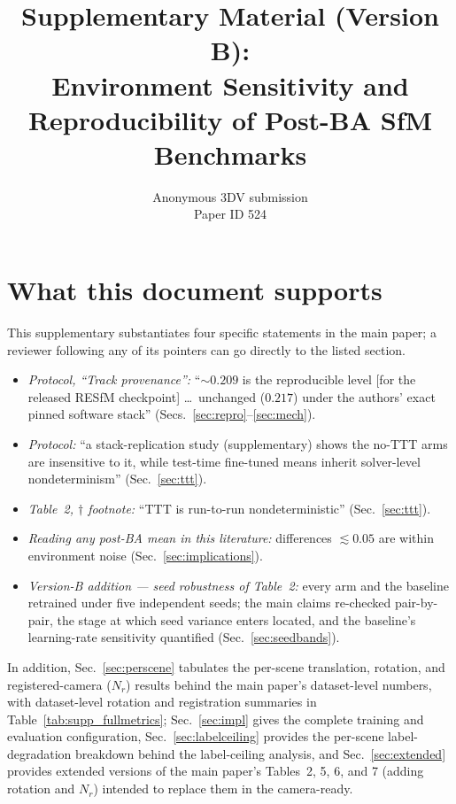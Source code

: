 \documentclass[10pt,twocolumn,letterpaper]{article}
\title{Supplementary Material (Version B):\\
Environment Sensitivity and Reproducibility of Post-BA SfM Benchmarks}
\author{Anonymous 3DV submission\\ Paper ID 524}
\begin{document}
\maketitle
\setcounter{table}{7}
\setcounter{figure}{4}

\section{What this document supports}
This supplementary substantiates four specific statements in the main paper; a reviewer
following any of its pointers can go directly to the listed section.
\begin{itemize}\itemsep2pt
\item \emph{Protocol, ``Track provenance'':} ``$\sim\!0.209$ is the reproducible level
[for the released RESfM checkpoint] \ldots\ unchanged ($0.217$) under the authors'
exact pinned software stack'' (Secs.~\ref{sec:repro}--\ref{sec:mech}).
\item \emph{Protocol:} ``a stack-replication study (supplementary) shows the no-TTT arms
are insensitive to it, while test-time fine-tuned means inherit solver-level
nondeterminism'' (Sec.~\ref{sec:ttt}).
\item \emph{Table~2, $\dagger$ footnote:} ``TTT is run-to-run nondeterministic''
(Sec.~\ref{sec:ttt}).
\item \emph{Reading any post-BA mean in this literature:} differences
$\lesssim\!0.05$ are within environment noise (Sec.~\ref{sec:implications}).
\item \emph{Version-B addition --- seed robustness of Table~2:} every arm and the
baseline retrained under five independent seeds; the main claims re-checked pair-by-pair,
the stage at which seed variance enters located, and the baseline's learning-rate
sensitivity quantified (Sec.~\ref{sec:seedbands}).
\end{itemize}
In addition, Sec.~\ref{sec:perscene} tabulates the per-scene translation, rotation, and
registered-camera ($N_r$) results behind the main paper's dataset-level numbers, with
dataset-level rotation and registration summaries in Table~\ref{tab:supp_fullmetrics};
Sec.~\ref{sec:impl} gives the complete training and
evaluation configuration, Sec.~\ref{sec:labelceiling} provides the per-scene
label-degradation breakdown behind the label-ceiling analysis, and
Sec.~\ref{sec:extended} provides extended versions of the main paper's Tables~2, 5, 6,
and 7 (adding rotation and $N_r$) intended to replace them in the camera-ready.
\end{document}
